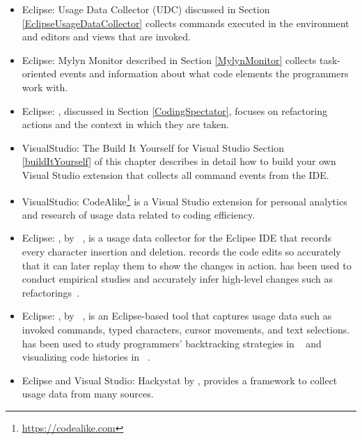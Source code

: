 \begin{itemize}

	\item[]Eclipse: Usage Data Collector (UDC) discussed in Section \ref{EclipseUsageDataCollector} collects commands executed in the environment and editors and views that are invoked.
	
	\item[]Eclipse: Mylyn Monitor described in Section \ref{MylynMonitor} collects task-oriented events and information about what code elements the programmers work with.
	
    \item[]Eclipse: \CodingSpectator %
, discussed in Section \ref{CodingSpectator}, focuses on refactoring actions and the context in which they are taken.

	\item[]VisualStudio: The Build It Yourself for Visual Studio Section \ref{buildItYourself} of this chapter describes in detail how to build your own Visual Studio extension that collects all command events from the IDE.



	\item[]VisualStudio: CodeAlike\footnote{\url{https://codealike.com}} is a Visual Studio extension for personal analytics and research of usage data related to coding efficiency. 

    \item[]Eclipse: \CodingTracker, by ~, is a usage data collector for the Eclipse IDE that records every character insertion and deletion. \CodingTracker{} records the code edits so accurately that it can later replay them to show the changes in action. \CodingTracker{} has been used to conduct empirical studies and accurately infer high-level changes such as refactorings~\cite{NegaraETAL2013ManualRefactorings}.

    \item[]Eclipse: \Fluorite, by ~, is an Eclipse-based tool that captures usage data such as invoked commands, typed characters, cursor movements, and text selections. \Fluorite{} has been used to study programmers' backtracking strategies in ~\cite{YoonMyers2012Backtracking} and visualizing code histories in ~\cite{YoonETAL2013VisualizeChange}.

	\item[]Eclipse and Visual Studio: Hackystat by , provides a framework to collect usage data from many sources.%
\end{itemize}

